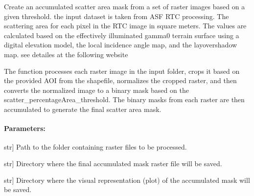 \documentclass[letterpaper,10pt,english]{sphinxmanual}
\begin{document}
\begin{fulllineitems}
\label{\detokenize{akhdefo_functions:akhdefo_functions.Akhdefo_Tools.scatter_area_mask}}
\pysigstartsignatures
{}
\pysigstopsignatures
\sphinxAtStartPar
Create an accumulated scatter area mask from a set of raster images based on a given threshold. the input dataset is taken from ASF RTC processing.
The scattering area for each pixel in the RTC image in square meters. The values are calculated based on the effectively illuminated gamma\sphinxhyphen{}0 terrain surface using a digital elevation model, 
the local incidence angle map, and the layover\sphinxhyphen{}shadow map. see detailes at the following website 

\sphinxAtStartPar
The function processes each raster image in the input folder, crops it based on the provided AOI
from the shapefile, normalizes the cropped raster, and then converts the normalized image to a binary
mask based on the scatter\_percentageArea\_threshold. The binary masks from each raster are then accumulated
to generate the final scatter area mask.


\paragraph{Parameters:}
\label{\detokenize{akhdefo_functions:id14}}\begin{description}
\sphinxlineitem{input\_folder}{[}str{]}
\sphinxAtStartPar
Path to the folder containing raster files to be processed.

\sphinxlineitem{output\_folder}{[}str{]}
\sphinxAtStartPar
Directory where the final accumulated mask raster file will be saved.

\sphinxlineitem{plot\_folder}{[}str{]}
\sphinxAtStartPar
Directory where the visual representation (plot) of the accumulated mask will be saved.


\end{description}
\end{fulllineitems}
\end{document}
